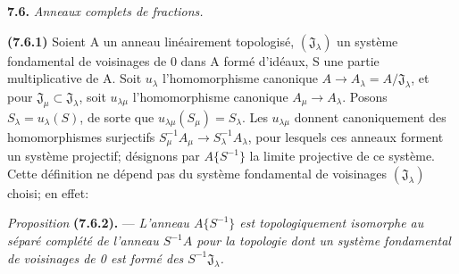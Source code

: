 \textbf{7.6.} \textit{Anneaux complets de fractions.}

\textbf{(7.6.1)} Soient A un anneau linéairement topologisé, $(\mathfrak J_\lambda)$ un système fondamental de voisinages de 0 dans A formé d'idéaux, S une partie multiplicative de A. Soit $u_\lambda$ l'homomorphisme canonique $A\to A_\lambda=A/\mathfrak J_\lambda$, et pour $\mathfrak J_\mu\subset\mathfrak J_\lambda$, soit $u_{\lambda\mu}$ l'homomorphisme canonique $A_\mu\to A_\lambda$. Posons $S_\lambda=u_\lambda(S)$, de sorte que $u_{\lambda\mu}(S_\mu)=S_\lambda$. Les $u_{\lambda\mu}$ donnent canoniquement des homomorphismes surjectifs $S_\mu^{-1}A_\mu\to S_\lambda^{-1}A_\lambda$, pour lesquels ces anneaux forment un système projectif; désignons par $A\{S^{-1}\}$ la limite projective de ce système. Cette définition ne dépend pas du système fondamental de voisinages $(\mathfrak J_\lambda)$ choisi; en effet:

\textit{Proposition} \textbf{(7.6.2).} --- \textit{L'anneau $A\{S^{-1}\}$ est topologiquement isomorphe au séparé complété de l'anneau $S^{-1}A$ pour la topologie dont un système fondamental de voisinages de 0 est formé des $S^{-1}\mathfrak J_\lambda$.}

